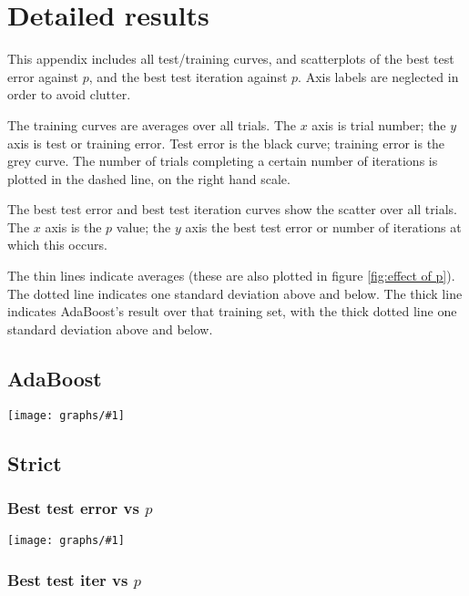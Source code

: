 

\newcommand{\ig}[1]{\hspace*{-1cm}\texttt{[image: graphs/\#1]}}

\chapter{Detailed results}
\label{appendix:allgraphs}

This appendix includes all test/training curves, and scatterplots of
the best test error against $p$, and the best test iteration against
$p$.  Axis labels are neglected in order to avoid clutter.

The training curves are averages over all trials.  The $x$ axis is
trial number; the $y$ axis is test or training error.  Test error is
the black curve; training error is the grey curve.  The number of
trials completing a certain number of iterations is plotted in the
dashed line, on the right hand scale.

The best test error and best test iteration curves show the scatter
over all trials.  The $x$ axis is the $p$ value; the $y$ axis the best
test error or number of iterations at which this occurs.

The thin lines indicate averages (these are also plotted in figure
\ref{fig:effect of p}).  The dotted line indicates one standard
deviation above and below.  The thick line indicates AdaBoost's result
over that training set, with the thick dotted line one standard
deviation above and below.

\section{AdaBoost}

\ig{boost-summary}

\section{Strict}

\subsection*{Best test error vs $p$}

\ig{strict-err-summary}

\subsection*{Best test iter vs $p$}

